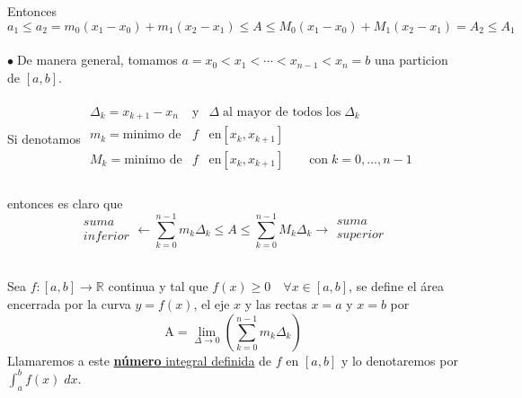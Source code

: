 \documentclass{article}
\theoremstyle{definition}
\theoremstyle{remark}
\newcommand\R{\ensuremath{\mathbb{R}}}
\newcommand\bl{$\bullet\;$}
\begin{document}
  \begin{figure}[h]
  \centering
  \def\svgwidth{0.55\textwidth}
  
  \end{figure}
  Entonces
  $$ a_1 \leq a_2 = m_0 (x_1-x_0)+m_1(x_2-x_1) \leq A \leq M_0 (x_1 - x_0) + M_1 (x_2 - x_1) = A_2 \leq A_1$$\\
\bl De manera general, tomamos $a=x_0 < x_1 < \cdots < x_{n-1}<x_n=b $ una particion de $[a,b]$. \\\\
Si denotamos $\begin{array}{lcl}
\Delta_k = x_{k+1}-x_n & \text{y} & \Delta \; \text{al mayor de todos los}\;  \Delta_k \\
m_k=\text{minimo de} & f & \text{en} [x_k,x_{k+1}] \\
M_k=\text{minimo de} & f & \text{en} [x_k,x_{k+1}] \quad \quad \text{con}\;  k=0, \dots , n-1\\
  \end{array}$\\\\
entonces es claro que
\[
\begin{array}{c}
  suma \\
  inferior
\end{array} \longleftarrow \sum_{k=0}^{n-1}{m_k\Delta_k}\leq A \leq \sum_{k=0}^{n-1}{M_k\Delta_k} \longrightarrow \begin{array}{c}
  suma \\
  superior
\end{array}
\]
\pagebreak
\begin{defi} \; \\
  Sea $f : [a,b] \to \R$ continua y tal que $f(x) \geq 0 \quad \forall x \in [a,b]$, se define el área encerrada por la curva $y=f(x)$, el eje $x$ y las rectas $x=a$ y $x=b$ por \[
\text{A} = \lim_{\Delta \to 0}\left( \sum_{k=0}^{n-1}{m_k\Delta_k}\right)
  \]
Llamaremos a este \underline{\textbf{número} integral definida} de $f$ en $[a,b]$ y lo denotaremos por $\int_{a}^{b}{f(x)\;dx}$.
\end{defi}
\end{document}
